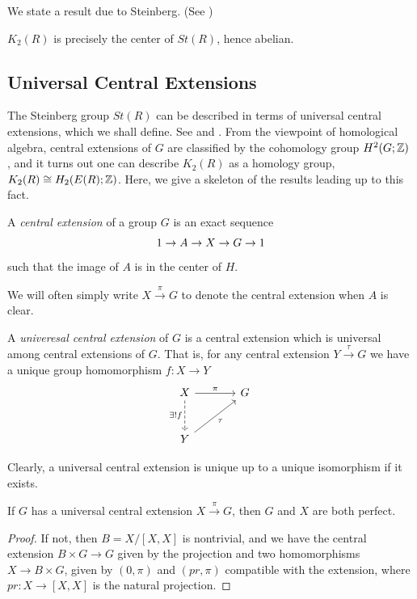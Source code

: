 We state a result due to Steinberg. (See \cite{Steinberg}) 
\begin{theorem}[Steinberg]
$K_2(R)$ is precisely the center of $St(R)$, hence abelian.
\end{theorem}

\subsection{Universal Central Extensions}

The Steinberg group $St(R)$ can be described in terms of universal 
central extensions, which we shall define. See \cite{Milnor} and \cite{Suz}. 
From the viewpoint of homological algebra, central extensions of $G$ are classified by
the cohomology group $H^2(G;\mathbb{Z})$ \cite{WeibelHomoAlg}, and it turns out one can describe $K_2(R)$
as a homology group, $K_2(R) \cong H_2(E(R);\mathbb{Z})$.
Here, we give a skeleton of the results leading up to this fact.

\begin{definition}
 A \emph{central extension} of a group $G$ is an exact sequence
 \[
 1 \to A \to X \to G \to 1
 \]
 such that the image of $A$ is in the center of $H$.
\end{definition}

We will often simply write $X \xrightarrow{\pi} G$ to denote the central extension when $A$ is clear.

\begin{definition}
A \emph{univeresal central extension} of $G$ is a central extension which is universal among central extensions of $G$. That is,
for any central extension $Y \xrightarrow{\tau} G$ we have a unique group homomorphism $f : X \to Y$
\[
\begin{tikzcd}[row sep=large, column sep=large]
X \arrow[r, "\pi"] \arrow[d, dashed, "\exists!f"'] & G \\
Y \arrow[ur, "\tau"']
\end{tikzcd}
\]
\end{definition}
Clearly, a universal central extension is unique up to a unique isomorphism if it exists.

\begin{lemma}
If $G$ has a universal central extension $X \xrightarrow{\pi} G$, then $G$ and $X$ are both perfect.
\end{lemma}
\begin{proof}
If not, then $B = X/[X,X]$ is nontrivial, and we have the central extension $B \times G \to G$ given by the projection and
two homomorphisms $X \to B \times G$,
given by $(0,\pi)$ and $(\mathord{pr},\pi)$ compatible with the extension, where $\mathord {pr} : X \to [X,X]$ is the natural projection.
\end{proof}


